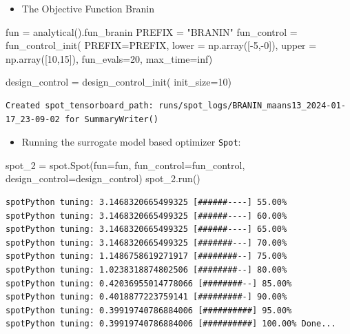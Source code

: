 \documentclass[
  letterpaper,
  DIV=11,
  numbers=noendperiod]{scrreprt}
\newenvironment{Shaded}{\begin{snugshade}}{\end{snugshade}}
\newcommand{\DecValTok}[1]{\textcolor[rgb]{0.68,0.00,0.00}{#1}}
\newcommand{\NormalTok}[1]{\textcolor[rgb]{0.00,0.23,0.31}{#1}}
\newcommand{\OperatorTok}[1]{\textcolor[rgb]{0.37,0.37,0.37}{#1}}
\newcommand{\StringTok}[1]{\textcolor[rgb]{0.13,0.47,0.30}{#1}}
\providecommand{\tightlist}{%
  \setlength{\itemsep}{0pt}\setlength{\parskip}{0pt}}\usepackage{longtable,booktabs,array}
\begin{document}
\begin{itemize}
\tightlist
\item
  The Objective Function Branin
\end{itemize}

\begin{Shaded}
\begin{Highlighting}[]
\NormalTok{fun }\OperatorTok{=}\NormalTok{ analytical().fun\_branin}
\NormalTok{PREFIX }\OperatorTok{=} \StringTok{"BRANIN"}
\NormalTok{fun\_control }\OperatorTok{=}\NormalTok{ fun\_control\_init(}
\NormalTok{    PREFIX}\OperatorTok{=}\NormalTok{PREFIX,}
\NormalTok{    lower }\OperatorTok{=}\NormalTok{ np.array([}\OperatorTok{{-}}\DecValTok{5}\NormalTok{,}\OperatorTok{{-}}\DecValTok{0}\NormalTok{]),}
\NormalTok{    upper }\OperatorTok{=}\NormalTok{ np.array([}\DecValTok{10}\NormalTok{,}\DecValTok{15}\NormalTok{]),}
\NormalTok{    fun\_evals}\OperatorTok{=}\DecValTok{20}\NormalTok{,}
\NormalTok{    max\_time}\OperatorTok{=}\NormalTok{inf)}

\NormalTok{design\_control }\OperatorTok{=}\NormalTok{ design\_control\_init(}
\NormalTok{    init\_size}\OperatorTok{=}\DecValTok{10}\NormalTok{)}
\end{Highlighting}
\end{Shaded}

\begin{verbatim}
Created spot_tensorboard_path: runs/spot_logs/BRANIN_maans13_2024-01-17_23-09-02 for SummaryWriter()
\end{verbatim}

\begin{itemize}
\tightlist
\item
  Running the surrogate model based optimizer \texttt{Spot}:
\end{itemize}

\begin{Shaded}
\begin{Highlighting}[]
\NormalTok{spot\_2 }\OperatorTok{=}\NormalTok{ spot.Spot(fun}\OperatorTok{=}\NormalTok{fun,}
\NormalTok{                   fun\_control}\OperatorTok{=}\NormalTok{fun\_control,}
\NormalTok{                   design\_control}\OperatorTok{=}\NormalTok{design\_control)}
\NormalTok{spot\_2.run()}
\end{Highlighting}
\end{Shaded}

\begin{verbatim}
spotPython tuning: 3.1468320665499325 [######----] 55.00% 
spotPython tuning: 3.1468320665499325 [######----] 60.00% 
spotPython tuning: 3.1468320665499325 [######----] 65.00% 
spotPython tuning: 3.1468320665499325 [#######---] 70.00% 
spotPython tuning: 1.1486758619271917 [########--] 75.00% 
spotPython tuning: 1.0238318874802506 [########--] 80.00% 
spotPython tuning: 0.42036955014778066 [########--] 85.00% 
spotPython tuning: 0.4018877223759141 [#########-] 90.00% 
spotPython tuning: 0.39919740786884006 [##########] 95.00% 
spotPython tuning: 0.39919740786884006 [##########] 100.00% Done...
\end{verbatim}
\end{document}
